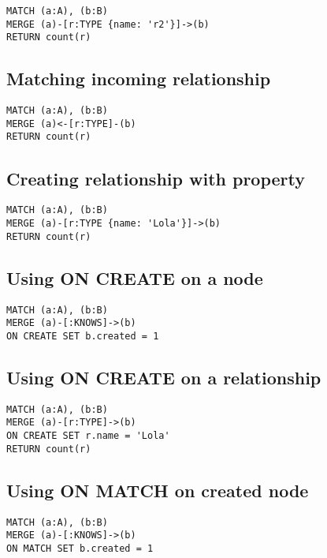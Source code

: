 \begin{lstlisting}
MATCH (a:A), (b:B)
MERGE (a)-[r:TYPE {name: 'r2'}]->(b)
RETURN count(r)
\end{lstlisting}

\subsection{Matching incoming relationship}

\begin{lstlisting}
MATCH (a:A), (b:B)
MERGE (a)<-[r:TYPE]-(b)
RETURN count(r)
\end{lstlisting}

\subsection{Creating relationship with property}

\begin{lstlisting}
MATCH (a:A), (b:B)
MERGE (a)-[r:TYPE {name: 'Lola'}]->(b)
RETURN count(r)
\end{lstlisting}

\subsection{Using ON CREATE on a node}

\begin{lstlisting}
MATCH (a:A), (b:B)
MERGE (a)-[:KNOWS]->(b)
ON CREATE SET b.created = 1
\end{lstlisting}

\subsection{Using ON CREATE on a relationship}

\begin{lstlisting}
MATCH (a:A), (b:B)
MERGE (a)-[r:TYPE]->(b)
ON CREATE SET r.name = 'Lola'
RETURN count(r)
\end{lstlisting}

\subsection{Using ON MATCH on created node}

\begin{lstlisting}
MATCH (a:A), (b:B)
MERGE (a)-[:KNOWS]->(b)
ON MATCH SET b.created = 1
\end{lstlisting}

